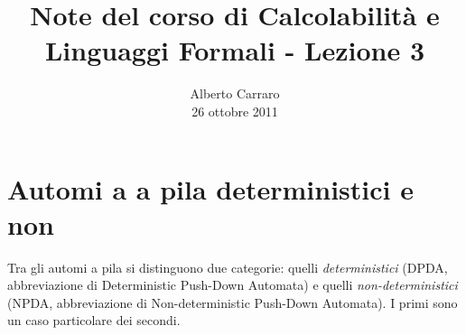\documentclass[runningheads,a4paper]{llncs}
\begin{document}
\mainmatter  %

\title{Note del corso di Calcolabilit\`{a} e Linguaggi Formali - Lezione 3}


%
%
\author{Alberto Carraro \\ 26 ottobre 2011}
%


%
%




\maketitle

\section{Automi a a pila deterministici e non}

Tra gli automi a pila si distinguono due categorie: quelli \emph{deterministici} (DPDA, abbreviazione di Deterministic Push-Down Automata) e quelli \emph{non-deterministici} (NPDA, abbreviazione di Non-deterministic Push-Down Automata). I primi sono un caso particolare dei secondi.
\end{document}
